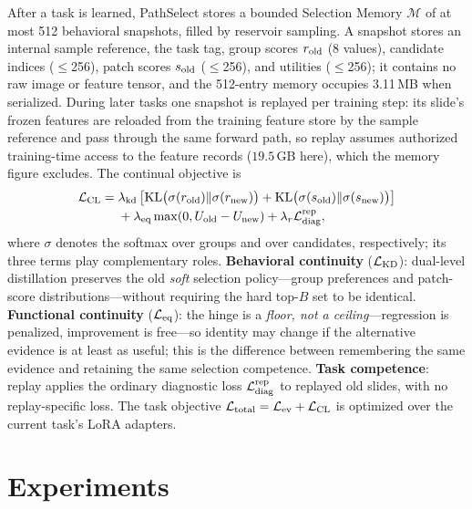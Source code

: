 \documentclass{article}
\def\L{{\cal L}}
\newcommand{\Mem}{\mathcal{M}}
\begin{document}
After a task is learned, PathSelect stores a bounded Selection Memory $\Mem$ of at most 512 behavioral snapshots, filled by reservoir sampling. A snapshot stores an internal sample reference, the task tag, group scores $r_{\rm old}$ (8 values), candidate indices ($\le$256), patch scores $s_{\rm old}$ ($\le$256), and utilities ($\le$256); it contains no raw image or feature tensor, and the 512-entry memory occupies 3.11\,MB when serialized. During later tasks one snapshot is replayed per training step: its slide's frozen features are reloaded from the training feature store by the sample reference and pass through the same forward path, so replay assumes authorized training-time access to the feature records ($19.5$\,GB here), which the memory figure excludes. The continual objective is
\begin{align}
\L_{\mathrm{CL}}
={}&
\lambda_{\mathrm{kd}}
\left[
\mathrm{KL}\bigl(\sigma(r_{\mathrm{old}})\Vert \sigma(r_{\mathrm{new}})\bigr)
+
\mathrm{KL}\bigl(\sigma(s_{\mathrm{old}})\Vert \sigma(s_{\mathrm{new}})\bigr)
\right]
\nonumber\\
&+
\lambda_{\mathrm{eq}}
\max(0,U_{\mathrm{old}}-U_{\mathrm{new}})
+
\lambda_r \L_{\mathrm{diag}}^{\mathrm{rep}},
\label{eq:lcl}
\end{align}
where $\sigma$ denotes the softmax over groups and over candidates, respectively; its three terms play complementary roles. \textbf{Behavioral continuity} ($\L_{\rm KD}$): dual-level distillation preserves the old \emph{soft} selection policy---group preferences and patch-score distributions---without requiring the hard top-$B$ set to be identical. \textbf{Functional continuity} ($\L_{\rm eq}$): the hinge is a \emph{floor, not a ceiling}---regression is penalized, improvement is free---so identity may change if the alternative evidence is at least as useful; this is the difference between remembering the same evidence and retaining the same selection competence. \textbf{Task competence}: replay applies the ordinary diagnostic loss $\L_{\mathrm{diag}}^{\mathrm{rep}}$ to replayed old slides, with no replay-specific loss. The task objective $\L_{\mathrm{total}}=\L_{\mathrm{ev}}+\L_{\mathrm{CL}}$ is optimized over the current task's LoRA adapters.

\section{Experiments}
\label{sec:exp}
\end{document}
